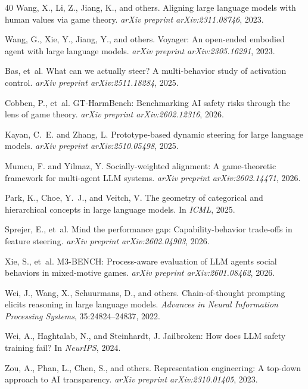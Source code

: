 \documentclass{article}
\begin{document}
{\begin{thebibliography}{40}
Wang, X., Li, Z., Jiang, K., and others.
\newblock Aligning large language models with human values via game theory.
\newblock \textit{arXiv preprint arXiv:2311.08746}, 2023.

Wang, G., Xie, Y., Jiang, Y., and others.
\newblock Voyager: An open-ended embodied agent with large language models.
\newblock \textit{arXiv preprint arXiv:2305.16291}, 2023.

Bas, et~al.
\newblock What can we actually steer? A multi-behavior study of activation control.
\newblock \textit{arXiv preprint arXiv:2511.18284}, 2025.

Cobben, P., et~al.
\newblock GT-HarmBench: Benchmarking AI safety risks through the lens of game theory.
\newblock \textit{arXiv preprint arXiv:2602.12316}, 2026.

Kayan, C.~E. and Zhang, L.
\newblock Prototype-based dynamic steering for large language models.
\newblock \textit{arXiv preprint arXiv:2510.05498}, 2025.

Mumcu, F. and Yilmaz, Y.
\newblock Socially-weighted alignment: A game-theoretic framework for multi-agent LLM systems.
\newblock \textit{arXiv preprint arXiv:2602.14471}, 2026.

Park, K., Choe, Y.~J., and Veitch, V.
\newblock The geometry of categorical and hierarchical concepts in large language models.
\newblock In \textit{ICML}, 2025.

Sprejer, E., et~al.
\newblock Mind the performance gap: Capability-behavior trade-offs in feature steering.
\newblock \textit{arXiv preprint arXiv:2602.04903}, 2026.

Xie, S., et~al.
\newblock M3-BENCH: Process-aware evaluation of LLM agents social behaviors in mixed-motive games.
\newblock \textit{arXiv preprint arXiv:2601.08462}, 2026.

Wei, J., Wang, X., Schuurmans, D., and others.
\newblock Chain-of-thought prompting elicits reasoning in large language models.
\newblock \textit{Advances in Neural Information Processing Systems}, 35:24824--24837, 2022.

Wei, A., Haghtalab, N., and Steinhardt, J.
\newblock Jailbroken: How does LLM safety training fail?
\newblock In \textit{NeurIPS}, 2024.

Zou, A., Phan, L., Chen, S., and others.
\newblock Representation engineering: A top-down approach to AI transparency.
\newblock \textit{arXiv preprint arXiv:2310.01405}, 2023.

\end{thebibliography}
}
\end{document}
